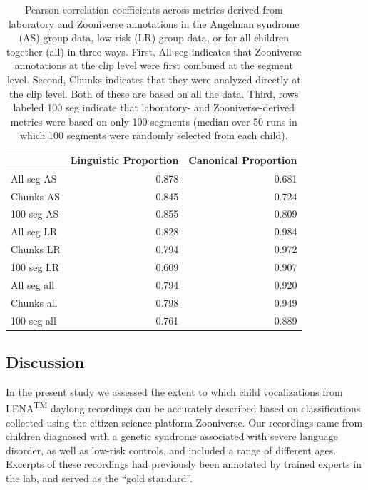 \documentclass[english,,man,floatsintext]{apa6}
\begin{document}
\begin{table}

\caption{\label{tab:tab-cors}Pearson correlation coefficients across metrics derived from laboratory and Zooniverse annotations in the Angelman syndrome (AS) group data, low-risk (LR) group data, or for all children together (all) in three ways. First, All seg indicates that Zooniverse annotations at the clip level were first combined at the segment level. Second, Chunks indicates that they were analyzed directly at the clip level. Both of these are based on all the data. Third, rows labeled 100 seg indicate that laboratory- and Zooniverse-derived metrics were based on only 100 segments (median over 50 runs in which 100 segments were randomly selected from each child).}
\centering
\begin{tabular}[t]{l|r|r}
\hline
  & Linguistic Proportion & Canonical Proportion\\
\hline
All seg AS & 0.878 & 0.681\\
\hline
Chunks AS & 0.845 & 0.724\\
\hline
100 seg AS & 0.855 & 0.809\\
\hline
All seg LR & 0.828 & 0.984\\
\hline
Chunks LR & 0.794 & 0.972\\
\hline
100 seg LR & 0.609 & 0.907\\
\hline
All seg all & 0.794 & 0.920\\
\hline
Chunks all & 0.798 & 0.949\\
\hline
100 seg all & 0.761 & 0.889\\
\hline
\end{tabular}
\end{table}

\hypertarget{discussion}{%
\subsection{Discussion}\label{discussion}}

In the present study we assessed the extent to which child vocalizations from LENA\textsuperscript{TM} daylong recordings can be accurately described based on classifications collected using the citizen science platform Zooniverse. Our recordings came from children diagnosed with a genetic syndrome associated with severe language disorder, as well as low-risk controls, and included a range of different ages. Excerpts of these recordings had previously been annotated by trained experts in the lab, and served as the \enquote{gold standard}.
\end{document}
